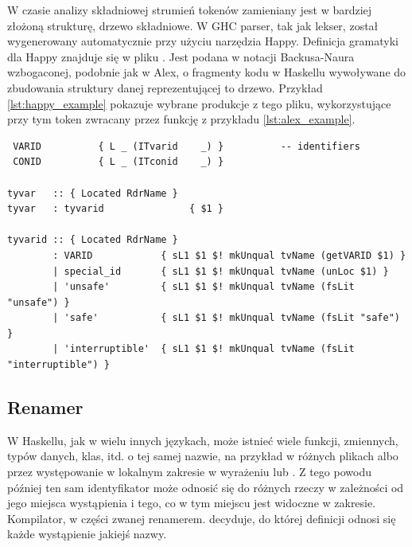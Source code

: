 W czasie analizy składniowej strumień tokenów zamieniany jest w bardziej złożoną strukturę, drzewo składniowe. W GHC parser, tak jak lekser, został wygenerowany automatycznie przy użyciu narzędzia Happy. Definicja gramatyki dla Happy znajduje się w pliku . Jest podana w notacji Backusa-Naura wzbogaconej, podobnie jak w Alex, o fragmenty kodu w Haskellu wywoływane do zbudowania struktury danej reprezentującej to drzewo\cite{DocsHappy}. Przykład \ref{lst:happy_example} pokazuje wybrane produkcje z tego pliku, wykorzystujące przy tym token  zwracany przez funkcję  z przykładu \ref{lst:alex_example}.
{
\begin{lstlisting}[float,label={lst:happy_example},
                   caption={Wycinki z pliku \code{Parser.y} z produkcjami odpowiadającymi za zmienne typów, wykorzystujące tokeny, których dotyczył przykład \ref{lst:alex_example}.}]
%token
 VARID          { L _ (ITvarid    _) }          -- identifiers
 CONID          { L _ (ITconid    _) }

tyvar   :: { Located RdrName }
tyvar   : tyvarid               { $1 }

tyvarid :: { Located RdrName }
        : VARID            { sL1 $1 $! mkUnqual tvName (getVARID $1) }
        | special_id       { sL1 $1 $! mkUnqual tvName (unLoc $1) }
        | 'unsafe'         { sL1 $1 $! mkUnqual tvName (fsLit "unsafe") }
        | 'safe'           { sL1 $1 $! mkUnqual tvName (fsLit "safe") }
        | 'interruptible'  { sL1 $1 $! mkUnqual tvName (fsLit "interruptible") }
\end{lstlisting}

\subsection{Renamer}\label{sec:renamer}

W Haskellu, jak w wielu innych językach, może istnieć wiele funkcji, zmiennych, typów danych, klas, itd. o tej samej nazwie, na przykład w różnych plikach albo przez występowanie w lokalnym zakresie w wyrażeniu  lub . Z tego powodu później ten sam identyfikator może odnosić się do różnych rzeczy w zależności od jego miejsca wystąpienia i tego, co w tym miejscu jest widoczne w zakresie. Kompilator, w części zwanej renamerem. decyduje, do której definicji odnosi się każde wystąpienie jakiejś nazwy.

}
